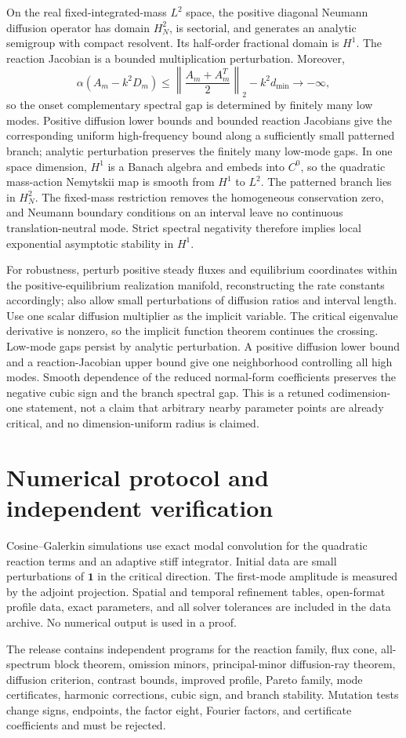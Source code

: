 \documentclass[10pt]{article}
\newcommand{\1}{\mathbf1}
\begin{document}
On the real fixed-integrated-mass $L^2$ space, the positive diagonal Neumann
diffusion operator has domain $H_N^2$, is sectorial, and generates an analytic
semigroup with compact resolvent.  Its half-order fractional domain is $H^1$.
The reaction Jacobian is a bounded multiplication perturbation.  Moreover,
\[
 \alpha(A_m-k^2D_m)
 \le\left\|\frac{A_m+A_m^T}{2}\right\|_2-k^2d_{\min}\to-\infty,
\]
so the onset complementary spectral gap is determined by finitely many low
modes.  Positive diffusion lower bounds and bounded reaction Jacobians give
the corresponding uniform high-frequency bound along a sufficiently small
patterned branch; analytic perturbation preserves the finitely many low-mode
gaps.  In one space
dimension, $H^1$ is a Banach algebra and embeds into $C^0$, so the quadratic
mass-action Nemytskii map is smooth from $H^1$ to $L^2$.  The patterned branch
lies in $H_N^2$.  The fixed-mass restriction removes the homogeneous
conservation zero, and Neumann boundary conditions on an interval leave no
continuous translation-neutral mode.  Strict spectral negativity therefore
implies local exponential asymptotic stability in $H^1$.

For robustness, perturb positive steady fluxes and equilibrium coordinates
within the positive-equilibrium realization manifold, reconstructing the
rate constants accordingly; also allow small perturbations of diffusion
ratios and interval length.  Use one scalar diffusion multiplier as the
implicit variable.  The critical eigenvalue derivative is nonzero, so the
implicit function theorem continues the crossing.  Low-mode gaps persist by
analytic perturbation.  A positive diffusion lower bound and a
reaction-Jacobian upper bound give one neighborhood controlling all high
modes.  Smooth dependence of the reduced normal-form coefficients preserves the
negative cubic sign and the branch spectral gap.  This is a retuned
codimension-one statement, not a claim that arbitrary nearby parameter points
are already critical, and no dimension-uniform radius is claimed.

\section{Numerical protocol and independent verification}

Cosine--Galerkin simulations use exact modal convolution for the quadratic
reaction terms and an adaptive stiff integrator.  Initial data are small
perturbations of $\1$ in the critical direction.  The first-mode amplitude is
measured by the adjoint projection.  Spatial and temporal refinement tables,
open-format profile data, exact parameters, and all solver tolerances are
included in the data archive.  No numerical output is used in a proof.

The release contains independent programs for the reaction family, flux cone,
all-spectrum block theorem, omission minors, principal-minor diffusion-ray theorem, diffusion
criterion, contrast bounds, improved profile, Pareto family, mode
certificates, harmonic corrections, cubic sign, and branch stability.
Mutation tests change signs, endpoints, the factor eight, Fourier factors,
and certificate coefficients and must be rejected.
\end{document}

